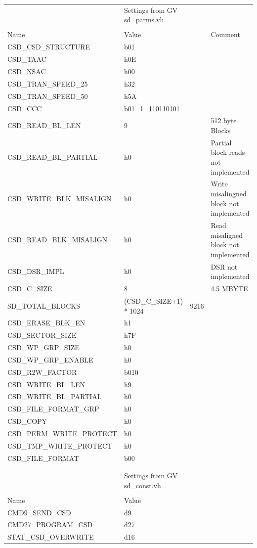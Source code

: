 \documentclass[]{article}
\begin{document}
\begin{tabular}{l|l|l|l}

	&Settings from GV sd\_parms.vh&& \\
	&&& \\
	Name&Value&&Comment \\
	CSD\_CSD\_STRUCTURE&b01&& \\
	CSD\_TAAC&h0E&& \\
	CSD\_NSAC&h00&& \\
	CSD\_TRAN\_SPEED\_25&h32&& \\
	CSD\_TRAN\_SPEED\_50&h5A&& \\
	CSD\_CCC&b01\_1\_110110101&& \\
	CSD\_READ\_BL\_LEN&9&&512 byte Blocks \\
	CSD\_READ\_BL\_PARTIAL&h0&&Partial block reads not implemented \\
	CSD\_WRITE\_BLK\_MISALIGN&h0&&Write misalingned block not implemented \\
	CSD\_READ\_BLK\_MISALIGN&h0&&Read misaligned block not implemented \\
	CSD\_DSR\_IMPL&h0&&DSR not implemented \\
	CSD\_C\_SIZE&8&&4.5 MBYTE \\
	SD\_TOTAL\_BLOCKS&(CSD\_C\_SIZE+1) * 1024&9216& \\
	CSD\_ERASE\_BLK\_EN&h1&& \\
	CSD\_SECTOR\_SIZE&h7F&& \\
	CSD\_WP\_GRP\_SIZE&h0&& \\
	CSD\_WP\_GRP\_ENABLE&h0&& \\
	CSD\_R2W\_FACTOR&b010&& \\
	CSD\_WRITE\_BL\_LEN&h9&& \\
	CSD\_WRITE\_BL\_PARTIAL&h0&& \\
	CSD\_FILE\_FORMAT\_GRP&h0&& \\
	CSD\_COPY&h0&& \\
	CSD\_PERM\_WRITE\_PROTECT&h0&& \\
	CSD\_TMP\_WRITE\_PROTECT&h0&& \\
	CSD\_FILE\_FORMAT&b00&& \\
	&&& \\
	&&& \\
	&Settings from GV sd\_const.vh&& \\
	&&& \\
	Name&Value&& \\
	CMD9\_SEND\_CSD&d9&& \\
	CMD27\_PROGRAM\_CSD&d27&& \\
	STAT\_CSD\_OVERWRITE&d16&& \\
	
	
\end{tabular}
\end{document}
